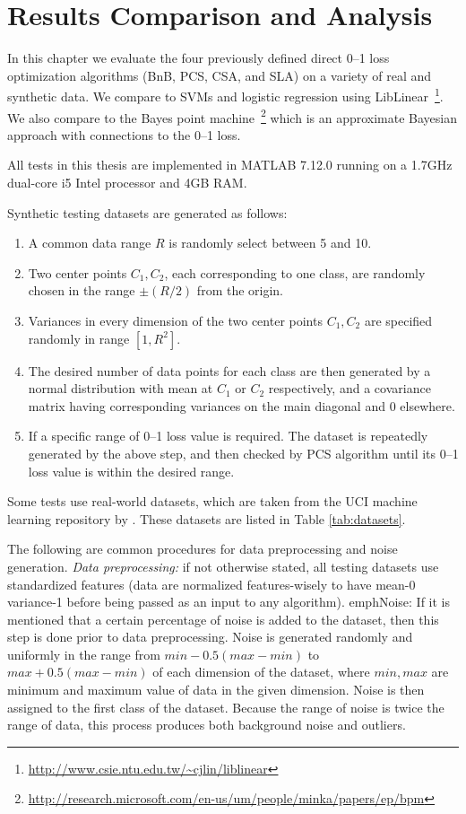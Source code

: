 \section{Results Comparison and Analysis}
\label{cha:results}

In this chapter we evaluate the four previously defined direct 0--1
loss optimization algorithms (BnB, PCS, CSA, and SLA) on a variety of
real and synthetic data.  We compare to SVMs and logistic regression
using LibLinear~\cite{linearSVM}\footnote{
  \url{http://www.csie.ntu.edu.tw/~cjlin/liblinear}}.  We also compare
to the Bayes point machine~\cite{bpm}\footnote{
  \url{http://research.microsoft.com/en-us/um/people/minka/papers/ep/bpm}}
which is an approximate Bayesian approach with connections to the 0--1
loss.

All tests in this thesis are implemented in MATLAB 7.12.0 running on a
1.7GHz dual-core i5 Intel processor and 4GB RAM.

Synthetic testing datasets are generated as follows: 
\begin{enumerate}
  \setlength{\itemsep}{4pt}
  \setlength{\parskip}{1pt}
  \setlength{\parsep}{1pt}
	\item A common data range $R$ is randomly select between 5 and 10. 
	\item Two center points $C_1, C_2$, each corresponding to one class, are randomly chosen in the range $\pm (R/2)$ from the origin. 
	\item Variances in every dimension of the two center points $C_1, C_2$ are specified randomly in range $[1, R^2]$. 
	\item The desired number of data points for each class are then generated by a normal distribution with mean at $C_1$ or $C_2$ respectively, and a covariance matrix having corresponding variances on the main diagonal and 0 elsewhere.     
	\item If a specific range of 0--1 loss value is required. The dataset is repeatedly generated by the above step, and then checked by PCS algorithm until its 0--1 loss value is within the desired range.
\end{enumerate}

Some tests use real-world datasets, which are taken from the UCI
machine learning repository by \cite{ucidata}. These datasets are
listed in Table \ref{tab:datasets}.

The following are common procedures for data preprocessing and noise
generation.  \emph{Data preprocessing:} if not otherwise stated, all
testing datasets use standardized features (data are normalized
features-wisely to have mean-0 variance-1 before being passed as an
input to any algorithm).  emph{Noise:} If it is mentioned that a
certain percentage of noise is added to the dataset, then this step is
done prior to data preprocessing. Noise is generated randomly and
uniformly in the range from $min - 0.5(max-min)$ to $max +
0.5(max-min)$ of each dimension of the dataset, where $min, max$ are
minimum and maximum value of data in the given dimension. Noise is
then assigned to the first class of the dataset. Because the range of
noise is twice the range of data, this process produces both
background noise and outliers.

